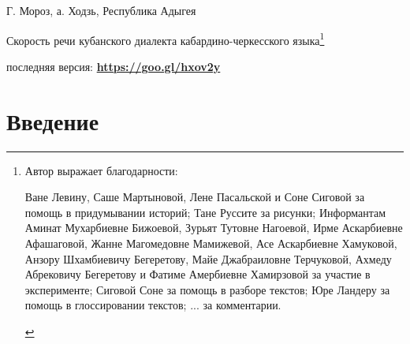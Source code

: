 
\usepackage{alltt}

\begin{flushright}
	{\footnotesize Г. Мороз, а. Ходзь, Республика Адыгея}
\end{flushright}
\begin{center}{\Large Скорость речи кубанского диалекта кабардино-черкесского языка\footnote{Автор выражает благодарности:
\begin{itemize}
\mytem Ване Левину, Саше Мартыновой, Лене Пасальской и Соне Сиговой за помощь в придумывании историй;
\mytem Тане Руссите за рисунки;
\mytem Информантам Аминат Мухарбиевне Бижоевой, Зурьят Тутовне Нагоевой, Ирме Аскарбиевне Афашаговой, Жанне Магомедовне Мамижевой, Асе Аскарбиевне Хамуковой, Анзору Шхамбиевичу Бегеретову, Майе Джабраиловне Терчуковой,  Ахмеду Абрековичу Бегеретову и Фатиме Амербиевне Хамирзовой за участие в эксперименте;
\mytem Сиговой Соне за помощь в разборе текстов;
\mytem Юре Ландеру за помощь в глоссировании текстов;
\mytem ... за комментарии.
\end{itemize}}}
\end{center}
{\noindent\footnotesize последняя версия: \textbf{\href{https://goo.gl/hxov2y}{https://goo.gl/hxov2y}}}
\tableofcontents
\vfill
\pagebreak
\section{Введение}
